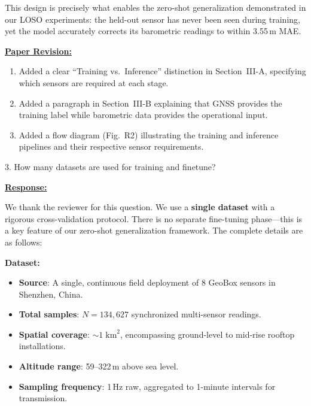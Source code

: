 This design is precisely what enables the zero-shot generalization demonstrated in our LOSO experiments: the held-out sensor has never been seen during training, yet the model accurately corrects its barometric readings to within 3.55\,m MAE.

\vspace{0.1cm}
\noindent
\underline{\textbf{Paper Revision:}}

\begin{enumerate}
    \item Added a clear ``Training vs.\ Inference'' distinction in Section~III-A, specifying which sensors are required at each stage.
    \item Added a paragraph in Section~III-B explaining that GNSS provides the training label while barometric data provides the operational input.
    \item Added a flow diagram (Fig.~R2) illustrating the training and inference pipelines and their respective sensor requirements.
\end{enumerate}

\newpage

\begin{cmtthree}{}{}
3. How many datasets are used for training and finetune?

\end{cmtthree}
\vspace{0.1cm}
\noindent
\underline{\textbf{Response:}}
\vspace{0.2cm}

We thank the reviewer for this question. We use a \textbf{single dataset} with a rigorous cross-validation protocol. There is no separate fine-tuning phase---this is a key feature of our zero-shot generalization framework. The complete details are as follows:

\textbf{Dataset:}
\begin{itemize}
    \item \textbf{Source}: A single, continuous field deployment of 8 GeoBox sensors in Shenzhen, China.
    \item \textbf{Total samples}: $N = 134{,}627$ synchronized multi-sensor readings.
    \item \textbf{Spatial coverage}: ${\sim}1\;\text{km}^2$, encompassing ground-level to mid-rise rooftop installations.
    \item \textbf{Altitude range}: 59--322\,m above sea level.
    \item \textbf{Sampling frequency}: 1\,Hz raw, aggregated to 1-minute intervals for transmission.
\end{itemize}

